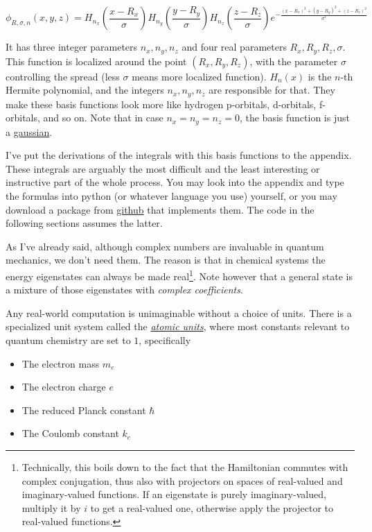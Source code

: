 \documentclass{article}
\newcommand{\githubrepo}{https://github.com/lisyarus/chembook}
\begin{document}
\begin{equation}
\phi_{R,\sigma,n}(x,y,z) = H_{n_x}\left(\frac{x-R_x}{\sigma}\right)H_{n_y}\left(\frac{y-R_y}{\sigma}\right)H_{n_z}\left(\frac{z-R_z}{\sigma}\right) e^{-\frac{(x-R_x)^2+(y-R_y)^2+(z-R_z)^2}{\sigma^2}}
\end{equation}

It has three integer parameters \(n_x,n_y,n_z\) and four real parameters \(R_x,R_y,R_z,\sigma\). This function is localized around the point \((R_x,R_y,R_z)\), with the parameter \(\sigma\) controlling the spread (less \(\sigma\) means more localized function). \(H_n(x)\) is the \(n\)-th Hermite polynomial, and the integers \(n_x,n_y,n_z\) are responsible for that. They make these basis functions look more like hydrogen p-orbitals, d-orbitals, f-orbitals, and so on. Note that in case \(n_x=n_y=n_z=0\), the basis function is just a \href{https://en.wikipedia.org/wiki/Gaussian_function}{gaussian}.

I've put the derivations of the integrals with this basis functions to the appendix. These integrals are arguably the most difficult and the least interesting or instructive part of the whole process. You may look into the appendix and type the formulas into python (or whatever language you use) yourself, or you may download a package from \href{\githubrepo/blob/master/code/hgto.py}{github} that implements them. The code in the following sections assumes the latter.

As I've already said, although complex numbers are invaluable in quantum mechanics, we don't need them. The reason is that in chemical systems the energy eigenstates can always be made real\footnote{Technically, this boils down to the fact that the Hamiltonian commutes with complex conjugation, thus also with projectors on spaces of real-valued and imaginary-valued functions. If an eigenstate is purely imaginary-valued, multiply it by \(i\) to get a real-valued one, otherwise apply the projector to real-valued functions.}. Note however that a general state is a mixture of those eigenstates with \textit{complex coefficients}.

Any real-world computation is unimaginable without a choice of units. There is a specialized unit system called the \href{https://en.wikipedia.org/wiki/Hartree_atomic_units}{\textit{atomic units}}, where most constants relevant to quantum chemistry are set to \(1\), specifically

\begin{itemize}
\item The electron mass \(m_e\)
\item The electron charge \(e\)
\item The reduced Planck constant \(\hbar\)
\item The Coulomb constant \(k_e\)
\end{itemize}
\end{document}
